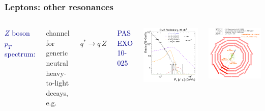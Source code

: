 \documentclass[compress]{beamer}
\begin{document}
\begin{frame}
\frametitle{Leptons: other resonances}

\begin{columns}
\textcolor{darkblue}{$Z$ boson $p_T$ spectrum:}

channel for generic neutral heavy-to-light decays, e.g.

\mbox{ } \hfill $q^* \to q \, Z$ \hfill \mbox{ }

\vspace{0.1 cm}
\textcolor{darkblue}{\scriptsize PAS EXO 10-025}

\includegraphics[width=\linewidth]{plots/boosted_z_spectrum.png}

\includegraphics[width=\linewidth]{plots/boosted_z_eventdisplay.png}
\end{columns}


\end{frame}
\end{document}
